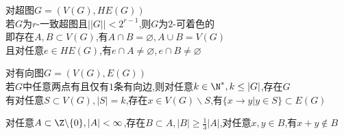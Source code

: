 \begin{dingli}
对超图$G=(V(G),HE(G))$\\
若$G$为$r$-一致超图且$||G||<2^{r-1}$,则$G$为$2$-可着色的\\
即存在$A,B\subset V(G)$,有$A\cap B=\varnothing, A\cup B=V(G)$\\
且对任意$e\in HE(G)$,有$e\cap A\neq\varnothing, e\cap B\neq \varnothing$ 
\end{dingli}

\begin{dingli}
对有向图$G=(V(G),E(G))$\\
若$G$中任意两点有且仅有$1$条有向边,则对任意$k\in\N^*,k\leq |G|$,存在$G$\\
有对任意$S\subset V(G),|S|=k$,存在$x\in V(G)\backslash S$,有$\{x\to y|y\in S\}\subset E(G)$
\end{dingli}

\begin{zhu}
对任意$A\subset\Z\backslash\{0\},|A|<\infty$,存在$B\subset A,|B|\geq\frac{1}{3}|A|$,对任意$x,y\in B$,有$x+y\notin B$
\end{zhu}

%